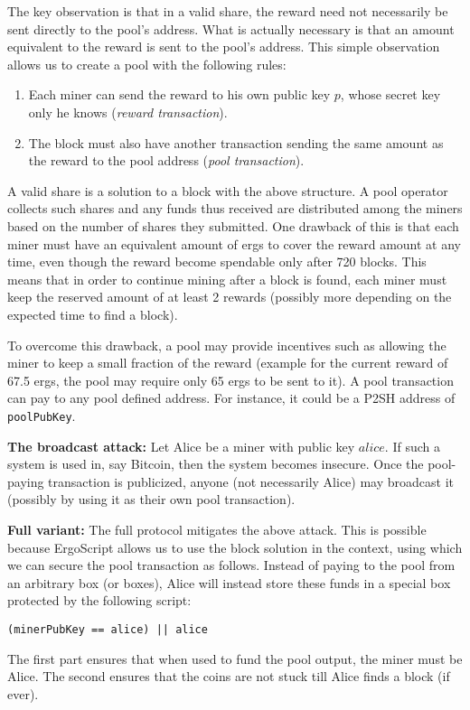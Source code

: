 \documentclass[11pt]{article}
\newcommand{\authnote}[2]{\marginpar{\parbox{\marginparwidth}{\tiny %
  \textsf{#1 {\textcolor{blue}{notes: #2}}}}}%
  \textcolor{blue}{\textbf{\dag}}}
\newcommand{\authnote}[2]{
  \textsf{#1 \textcolor{blue}{: #2}}}
\newcommand{\authnote}[2]{}
\newcommand{\snote}[1]{{\authnote{\textcolor{yellow}{Scalahub notes}}{#1}}}
\newcommand{\langname}{ErgoScript\xspace}
\begin{document}
The key observation is that in a valid share, the reward need not necessarily be sent directly to the pool's address. What is actually necessary is that an amount equivalent to the reward is sent to the pool's address. This simple observation allows us to create a pool with the following rules:
\begin{enumerate}
	\item Each miner can send the reward to his own public key $p$, whose secret key only he knows ({\em reward transaction}).
	\item The block must also have another transaction sending the same amount as the reward to the pool address ({\em pool transaction}).
\end{enumerate}

\snote{Maybe make this section less Ergo-specific}

A valid share is a solution to a block with the above structure. A pool operator collects such shares and any funds thus received are distributed among the miners based on the number of shares they submitted. One drawback of this is that each miner must have an equivalent amount of ergs to cover the reward amount at any time, even though the reward become spendable only after 720 blocks. 
This means that in order to continue mining after a block is found, each miner must keep the reserved amount of at least 2 rewards (possibly more depending on the expected time to find a block).

 To overcome this drawback, a pool may provide incentives such as allowing the miner to keep a small fraction of the reward (example for the current reward of 67.5 ergs, the pool may require only 65 ergs to be sent to it). A pool transaction can pay to any pool defined address. For instance, it could be a P2SH address of \texttt{poolPubKey}. 


\textbf{The broadcast attack:} Let Alice be a miner with public key $alice$. If such a system is used in, say Bitcoin, then the system becomes insecure. Once the pool-paying transaction is publicized, anyone (not necessarily Alice) may broadcast it (possibly by using it as their own pool transaction). 

\textbf{Full variant:} The full protocol mitigates the above attack. This is possible because \langname allows us to use the block solution in the context, using which we can secure the pool transaction as follows. Instead of paying to the pool from an arbitrary box (or boxes), Alice will instead store these funds in a special box protected by the following script:
\begin{verbatim}
(minerPubKey == alice) || alice
\end{verbatim}
The first part ensures that when used to fund the pool output, the miner must be Alice. The second ensures that the coins are not stuck till Alice finds a block (if ever). 
\end{document}
